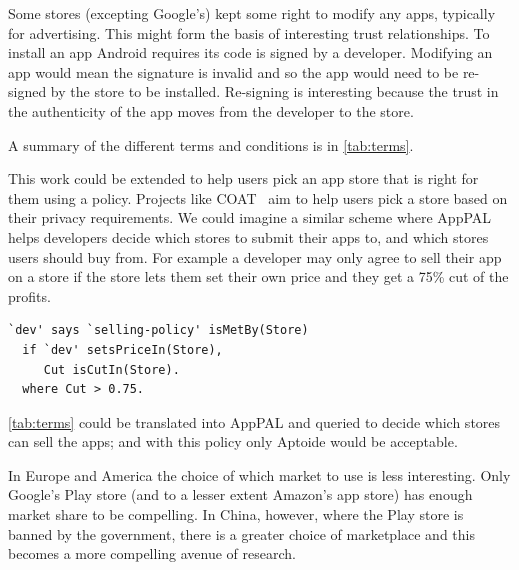 \documentclass[a4paper]{scrartcl}
\begin{document}
Some stores (excepting Google's) kept some right to modify any apps, typically for advertising.
This might form the basis of interesting trust relationships.
To install an app Android requires its code is signed by a developer.
Modifying an app would mean the signature is invalid and so the app would need to be re-signed by the store to be installed.
Re-signing is interesting because the trust in the authenticity of the app moves from the developer to the store.

A summary of the different terms and conditions is in \autoref{tab:terms}.

This work could be extended to help users pick an app store that is right for them using a policy.
Projects like COAT~\citep{Fernandez:5lFoplRA} aim to help users pick a store based on their privacy requirements.
We could imagine a similar scheme where AppPAL helps developers decide which stores to submit their apps to,
  and which stores users should buy from.
For example a developer may only agree to sell their app on a store if the store lets them set their own price and they get a 75\% cut of the profits.
\begin{lstlisting}
`dev' says `selling-policy' isMetBy(Store)
  if `dev' setsPriceIn(Store),
     Cut isCutIn(Store).
  where Cut > 0.75.
\end{lstlisting}
\autoref{tab:terms} could be translated into AppPAL and queried to decide which stores can sell the apps; and with this policy only Aptoide would be acceptable.

In Europe and America the choice of which market to use is less interesting.
Only Google's Play store (and to a lesser extent Amazon's app store) has enough market share to be compelling.
In China, however, where the Play store is banned by the government, there is a greater choice of marketplace and this becomes a more compelling avenue of research.
\end{document}
